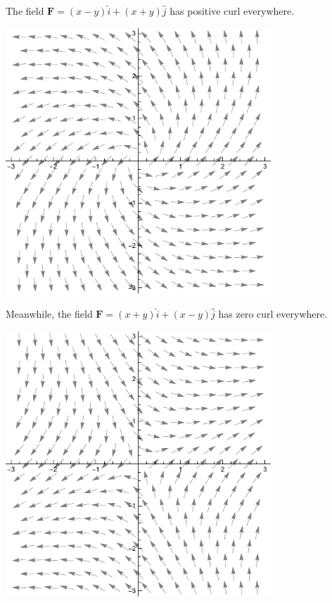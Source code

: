\documentclass[10pt]{mypackage}
\begin{document}
\begin{example}
  The field $\mathbf{F} = \left(x-y\right)\hat{i} + \left(x+y\right)\hat{j}$ has positive curl everywhere.
  \begin{center}
    \includegraphics[width=10cm]{images/curl1a.pdf}
  \end{center}
  Meanwhile, the field $\mathbf{F} = \left(x+y\right)\hat{i} + \left(x-y\right)\hat{j}$ has zero curl everywhere.
  \begin{center}
    \includegraphics[width=10cm]{images/curl1b.pdf}
  \end{center}
\end{example}
\end{document}
